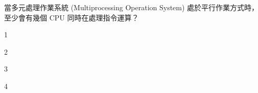 \ifx\ntpcNinetyTwo\undefined[92學年基北區] \fi
當多元處理作業系統 (Multiprocessing Operation System) 處於平行作業方式時，至少會有幾個 CPU 同時在處理指令運算？
  \begin{optionlist}
  \item 1
  \item 2\label{ntpc-92-a33}
  \item 3
  \item 4
  \end{optionlist}